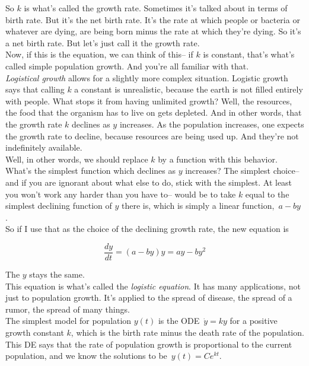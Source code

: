 So $k$ is what's called the growth rate.
Sometimes it's talked about in terms of birth rate.
But it's the net birth rate.
It's the rate at which people or bacteria or whatever are dying,
are being born minus the rate at which they're dying.
So it's a net birth rate.
But let's just call it the growth rate.\\
Now, if this is the equation, we can think of this--
if $k$ is constant, that's what's called simple population
growth. And you're all familiar with that.\\

\emph{Logistical growth} allows for a slightly more complex
situation.
Logistic growth says that calling $k$ a constant is unrealistic,
because the earth is not filled entirely with people.
What stops it from having unlimited growth?
Well, the resources, the food that the organism has to live on gets depleted.
And in other words, that the growth rate $k$ declines as $y$ increases.
As the population increases, one expects the growth rate
to decline, because resources are being used up.
And they're not indefinitely available.\\
Well, in other words, we should replace $k$ by a function with this behavior.
What's the simplest function which declines as $y$ increases?
The simplest choice-- and if you are ignorant about what else
to do, stick with the simplest.
At least you won't work any harder
than you have to-- would be to take $k$ equal to the simplest
declining function of $y$ there is, which is simply
a linear function, $\, a -  by\,$.\\
So if I use that as the choice of the declining growth rate,
the new equation is

\begin{equation*}
  \frac{dy}{dt} = (a - by)y = ay -by^2
\end{equation*}

The $y$ stays the same.\\
This equation is what's called the \emph{logistic equation}.
It has many applications, not just to population growth.
It's applied to the spread of disease, the spread of a rumor,
the spread of many things.\\

The simplest model for population $y(t)$ is the ODE $\, \dot y = ky$ for a positive growth constant $k$,
which is the birth rate minus the death rate of the population.
This DE says that the rate of population growth is proportional to the current population,
and we know the solutions to be $\, y(t) = Ce^{kt}$. 

\clearpage





